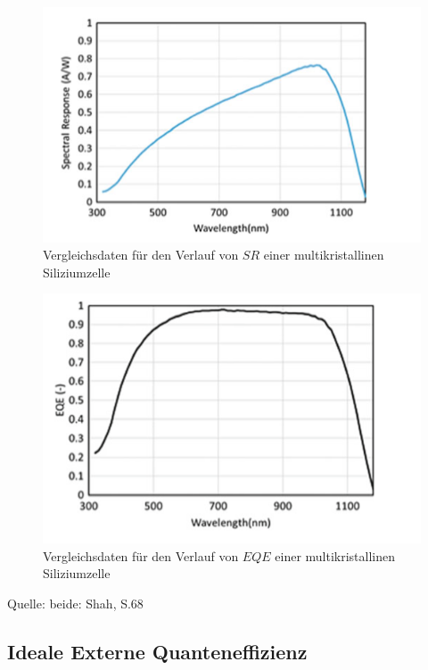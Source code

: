 \begin{figure}[ht]
    \centering
    \includegraphics[scale=0.75]{Bilder/TheorieSR.png}
    \caption{Vergleichsdaten für den Verlauf von $SR$ einer multikristallinen Siliziumzelle}
    \label{bild:ThSR}
\end{figure}

\begin{figure}[ht]
    \centering
    \includegraphics[scale=0.75]{Bilder/TheorieEQE.png}
    \caption{Vergleichsdaten für den Verlauf von $EQE$ einer multikristallinen Siliziumzelle}
    \label{bild:ThEQE}
\end{figure}

Quelle: beide: Shah, S.68



\subsection{Ideale Externe Quanteneffizienz}

